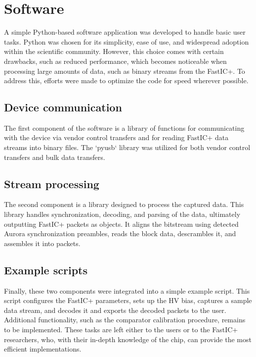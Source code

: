 \chapter{Software}
A simple Python-based software application was developed to handle basic user tasks. Python was chosen for its simplicity, ease of use, and widespread adoption within the scientific community. However, this choice comes with certain drawbacks, such as reduced performance, which becomes noticeable when processing large amounts of data, such as binary streams from the FastIC+. To address this, efforts were made to optimize the code for speed wherever possible.
\section{Device communication}
The first component of the software is a library of functions for communicating with the device via vendor control transfers and for reading FastIC+ data streams into binary files. The `pyusb` library was utilized for both vendor control transfers and bulk data transfers.

\section{Stream processing}
The second component is a library designed to process the captured data. This library handles synchronization, decoding, and parsing of the data, ultimately outputting FastIC+ packets as objects. It aligns the bitstream using detected Aurora synchronization preambles, reads the block data, descrambles it, and assembles it into packets.

\section{Example scripts}
Finally, these two components were integrated into a simple example script. This script configures the FastIC+ parameters, sets up the HV bias, captures a sample data stream, and decodes it and exports the decoded packets to the user. Additional functionality, such as the comparator calibration procedure, remains to be implemented. These tasks are left either to the users or to the FastIC+ researchers, who, with their in-depth knowledge of the chip, can provide the most efficient implementations.
